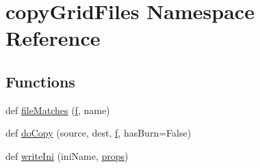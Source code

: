 \hypertarget{namespacecopyGridFiles}{}\section{copy\+Grid\+Files Namespace Reference}
\label{namespacecopyGridFiles}
\subsection*{Functions}
\begin{DoxyCompactItemize}
\item 
def \mbox{\hyperlink{namespacecopyGridFiles_a18b8cfd4665b3fdafe8c9bfdf21adbc9}{file\+Matches}} (\mbox{\hyperlink{namespacecopyGridFiles_a90ae0943b4d2a4255fc89daf0ac45e6a}{f}}, name)
\item 
def \mbox{\hyperlink{namespacecopyGridFiles_a2a1a9125be3fe46d8b1ae0f62f56c4c8}{do\+Copy}} (source, dest, \mbox{\hyperlink{namespacecopyGridFiles_a90ae0943b4d2a4255fc89daf0ac45e6a}{f}}, has\+Burn=False)
\item 
def \mbox{\hyperlink{namespacecopyGridFiles_afd2344d5174f737237e0a7dde1e08248}{write\+Ini}} (ini\+Name, \mbox{\hyperlink{namespacecopyGridFiles_aacf361e6d263bcbbbe8eb0d93179c78d}{props}})
\end{DoxyCompactItemize}
